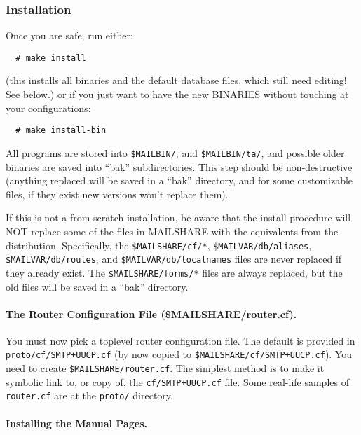 \subsubsection{Installation}

Once you are safe, run either:
\begin{verbatim}
  # make install
\end{verbatim}

(this installs all binaries and the default database files, which
still need editing! See below.)
or if you just want to have the new BINARIES without touching
at your configurations:
\begin{verbatim}
  # make install-bin
\end{verbatim}

All programs are stored into  {\tt \$MAILBIN/}, and {\tt \$MAILBIN/ta/}, and
possible older binaries are saved into ``bak'' subdirectories.
This step should be non-destructive (anything replaced will be
saved in a ``bak'' directory, and for some customizable files, if
they exist new versions won't replace them).

If this is not a from-scratch installation, be aware that the
install procedure will NOT replace some of the files in MAILSHARE
with the equivalents from the distribution.  Specifically, the
{\tt \$MAILSHARE/cf/*}, {\tt \$MAILVAR/db/aliases}, {\tt \$MAILVAR/db/routes}, and
{\tt \$MAILVAR/db/localnames} files are never replaced if they already
exist.  The {\tt \$MAILSHARE/forms/*} files are always replaced, but the
old files will be saved in a ``bak'' directory.


\paragraph{The Router Configuration File (\$MAILSHARE/router.cf).}

You must now pick a toplevel router configuration file.  The
default is provided in {\tt proto/cf/SMTP+UUCP.cf} (by now copied to
{\tt \$MAILSHARE/cf/SMTP+UUCP.cf}). You need to create {\tt \$MAILSHARE/router.cf}.
The simplest method is to make it symbolic link to, or copy of,
the {\tt cf/SMTP+UUCP.cf} file.
Some real-life samples of {\tt router.cf} are at the {\tt proto/} directory.


\paragraph{Installing the Manual Pages.}

